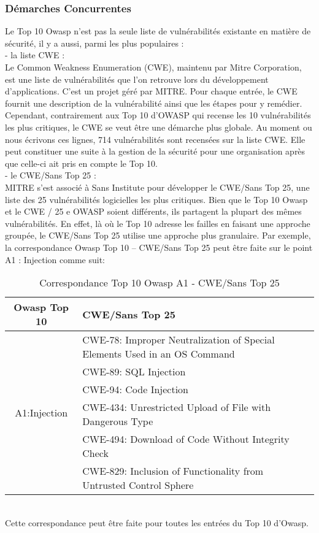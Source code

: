 \subsubsection{Démarches Concurrentes}
Le Top 10 Owasp n’est pas la seule liste de vulnérabilités existante en matière de sécurité, il y a aussi, parmi les plus populaires : \\
- la liste CWE : \\
Le Common Weakness Enumeration (CWE), maintenu par Mitre Corporation, est une liste de vulnérabilités que l’on retrouve lors du développement d’applications. C'est un projet  géré par MITRE. Pour chaque entrée, le CWE fournit une description de la vulnérabilité ainsi que les étapes pour y remédier.
Cependant, contrairement aux Top 10 d’OWASP qui recense les 10 vulnérabilités les plus critiques, le CWE se veut être une démarche plus globale. Au moment ou nous écrivons ces lignes, 714 vulnérabilités sont recensées sur la liste CWE. Elle peut constituer une suite à la gestion de la sécurité pour une organisation après que celle-ci ait pris en compte le Top 10. \\
- le CWE/Sans Top 25 : \\
MITRE s'est associé à Sans Institute pour développer le CWE/Sans Top 25, une liste des 25 vulnérabilités logicielles les plus critiques. Bien que le Top 10 Owasp et le CWE / 25 e OWASP soient différents, ils partagent la plupart des mêmes vulnérabilités. En effet, là où le Top 10 adresse les failles en faisant une approche groupée, le CWE/Sans Top 25 utilise une approche plus granulaire. Par exemple, la correspondance Owasp Top 10 – CWE/Sans Top 25 peut être faite sur le point A1 : Injection comme suit:
\begin{table}[hbt!]
	\centering
	\begin{tabular}{| c | l |} 
		\hline
		Owasp Top 10 & CWE/Sans Top 25 \\
		\hline
		\multirow{6}{4em}{A1:Injection} & CWE-78: Improper Neutralization of Special Elements Used in an OS Command \\ 
		& CWE-89: SQL Injection\\ 
		& CWE-94: Code Injection\\ 
		& CWE-434: Unrestricted Upload of File with Dangerous Type\\
		& CWE-494: Download of Code Without Integrity Check\\
		& CWE-829: Inclusion of Functionality from Untrusted Control Sphere\\
		\hline
	\end{tabular}
	\caption{Correspondance Top 10 Owasp A1 - CWE/Sans Top 25}
\end{table}\\
Cette correspondance peut être faite pour toutes les entrées du Top 10 d’Owasp.
\clearpage 
